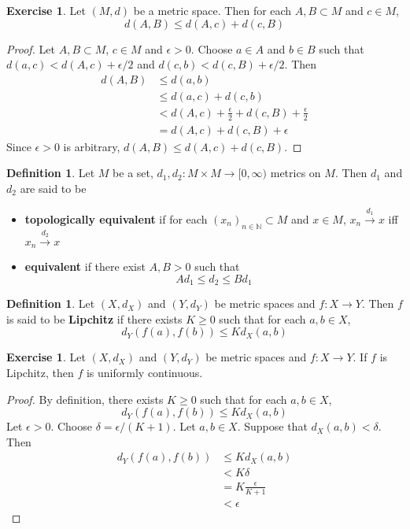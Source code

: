 \documentclass[12pt]{amsart}
\theoremstyle{definition}
\newtheorem{defn}[definition]{Definition}
\newtheorem{ex}[definition]{Exercise}
\newcommand{\del}{\delta}
\newcommand{\ep}{\epsilon}
\newcommand{\N}{\mathbb{N}}
\newcommand{\Rg}{[0,\infty)}
\newcommand{\conv}[1]{\xrightarrow{#1}}
\newcommand{\lex}[1]{\label{ex:#1}}
\newcommand{\ld}[1]{\label{defn:#1}}
\begin{document}
	\begin{ex} \lex{}
	Let $(M,d)$ be a metric space. Then for each $A,B \subset M$ and $c \in M$, $$d(A,B) \leq d(A,c) + d(c, B)$$
	\end{ex}
	
	\begin{proof}
	Let $A,B \subset M$, $c \in M$ and $\ep>0$. Choose $a \in A$ and $b \in B$ such that $d(a,c) < d(A,c)+ \ep/2$ and  $d(c,b) < d(c,B)+ \ep/2$. Then 
	\begin{align*}
	d(A,B) 
	&\leq d(a,b) \\
	&\leq d(a,c) + d(c,b) \\
	&< d(A,c) + \frac{\ep}{2} + d(c,B) + \frac{\ep}{2} \\
	&= d(A,c) + d(c,B) + \ep
	\end{align*}
	Since $\ep >0$ is arbitrary, $d(A,B) \leq d(A,c) + d(c,B)$.
	\end{proof}
	
	\begin{defn} \ld{}
	Let $M$ be a set, $d_1, d_2: M \times M \rightarrow \Rg$ metrics on $M$. Then $d_1$ and $d_2$ are said to be 
	\begin{itemize}
	\item \textbf{topologically equivalent} if for each $(x_n)_{n \in \N} \subset M$ and $x \in M$, $x_n \conv{d_1} x$ iff $x_n \conv{d_2} x$ 
	\item\textbf{equivalent} if there exist $A, B > 0$ such that $$A d_1 \leq d_2 \leq B d_1$$
\end{itemize}		
	\end{defn}	
	
	\begin{defn} \ld{}
	Let $(X, d_X)$ and $(Y, d_Y)$ be metric spaces and $f: X \rightarrow Y$. Then $f$ is said to be \textbf{Lipchitz} if there exists $K \geq 0$ such that for each $a, b \in X$, $$d_Y(f(a), f(b)) \leq Kd_X(a,b)$$
	\end{defn}	
	
	\begin{ex} \lex{}
	Let $(X, d_X)$ and $(Y, d_Y)$ be metric spaces and $f: X \rightarrow Y$. If $f$ is Lipchitz, then $f$ is uniformly continuous.	
	\end{ex}
	
	\begin{proof}
	By definition, there exists $K \geq 0$ such that for each $a, b \in X$, $$d_Y(f(a), f(b)) \leq Kd_X(a,b)$$ Let $\ep >0$. Choose $\del = \ep / (K+1)$. Let $a, b \in X$. Suppose that $d_X(a,b) < \del$. Then 
	\begin{align*}
	d_Y(f(a), f(b)) 
	& \leq Kd_X(a,b) \\
	& < K \del \\
	&= K \frac{\ep}{K+1} \\
	&< \ep  
	\end{align*}
	\end{proof}
	
\end{document}
